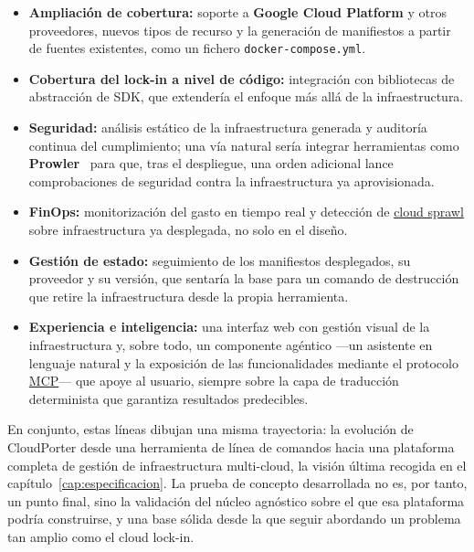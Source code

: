 \begin{itemize}
    \item \textbf{Ampliación de cobertura:} soporte a \textbf{Google Cloud Platform} y otros
    proveedores, nuevos tipos de recurso y la generación de manifiestos a partir de fuentes
    existentes, como un fichero \texttt{docker-compose.yml}.

    \item \textbf{Cobertura del lock-in a nivel de código:} integración con bibliotecas de
    abstracción de SDK, que extendería el enfoque más allá de la infraestructura.

    \item \textbf{Seguridad:} análisis estático de la infraestructura generada y auditoría
    continua del cumplimiento; una vía natural sería integrar herramientas como
    \textbf{Prowler}~\cite{prowler} para que, tras el despliegue, una orden adicional lance
    comprobaciones de seguridad contra la infraestructura ya aprovisionada.

    \item \textbf{FinOps:} monitorización del gasto en tiempo real y detección de
    \hyperlink{cloud-sprawl}{cloud sprawl} sobre infraestructura ya desplegada, no solo en el
    diseño.

    \item \textbf{Gestión de estado:} seguimiento de los manifiestos desplegados, su proveedor
    y su versión, que sentaría la base para un comando de destrucción que retire la
    infraestructura desde la propia herramienta.

    \item \textbf{Experiencia e inteligencia:} una interfaz web con gestión visual de la
    infraestructura y, sobre todo, un componente agéntico —un asistente en lenguaje natural y
    la exposición de las funcionalidades mediante el protocolo \hyperlink{mcp}{MCP}— que apoye
    al usuario, siempre sobre la capa de traducción determinista que garantiza resultados
    predecibles.
\end{itemize} 

En conjunto, estas líneas
dibujan una misma trayectoria: la evolución de CloudPorter desde una herramienta de línea de comandos
hacia una plataforma completa de gestión de infraestructura multi-cloud, la visión última recogida en
el capítulo~\ref{cap:especificacion}. La prueba de concepto desarrollada no es, por tanto, un punto
final, sino la validación del núcleo agnóstico sobre el que esa plataforma podría construirse, y una
base sólida desde la que seguir abordando un problema tan amplio como el cloud lock-in.
